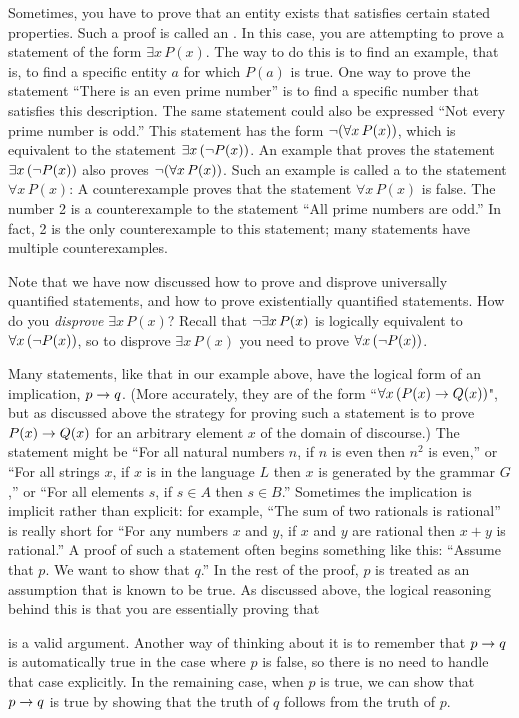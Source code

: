 Sometimes, you have to prove that an entity exists that satisfies
certain stated properties.  Such a proof is called an
.  In this case, you are attempting to
prove a statement of the form $\exists x\,P(x)$.  The way to
do this is to find an example, that is, to find a specific
entity $a$ for which $P(a)$ is true.  One way to prove
the statement ``There is an even prime number'' is to find
a specific number that satisfies this description.  
The same statement could also
be expressed ``Not every prime number is odd.''  This statement
has the form $\lnot(\forall x\,P(x))$, which is equivalent
to the statement $\exists x\,(\lnot P(x))$.  
An example that proves the statement $\exists x\,(\lnot P(x))$
also proves $\lnot(\forall x\,P(x))$.  Such an example is
called a  to the statement $\forall x\,P(x)$:
A counterexample proves that the statement $\forall x\,P(x)$ is false.
The number 2 is a counterexample to the statement ``All prime numbers
are odd.''  In fact, 2 is the only counterexample to this
statement; many statements have multiple counterexamples.

Note that we have now discussed how to prove and disprove
universally quantified statements, and how to prove existentially
quantified statements.  How do you {\em disprove} $\exists x\,P(x)$?
Recall that $\lnot \exists x\,P(x)$ is logically equivalent to
$\forall x\,(\lnot P(x))$, so to disprove $\exists x\,P(x)$ you need
to prove $\forall x\,(\lnot P(x))$.

Many statements, like that in our example above, 
have the logical form of an implication, $p\rightarrow q$.
(More accurately, they
are of the form ``$\forall x\, (P(x) \rightarrow Q(x))$", but as discussed above
the
strategy for proving such a statement is to prove $P(x) \rightarrow Q(x)$ 
for an arbitrary element $x$ of the
domain of discourse.)  The statement
might be ``For all natural numbers $n$, if $n$ is even then $n^2$ is even,'' or ``For
all strings $x$, if $x$ is in the language $L$ then $x$ is generated by the grammar $G$,''
or ``For all elements $s$, if $s \in A$ then $s \in B$.''  Sometimes the implication is
implicit rather than explicit: for example, ``The sum of two rationals is rational'' is
really short for ``For any numbers $x$ and $y$, if $x$ and $y$ are rational then $x+y$
is rational.''
A proof of such a statement often begins something like this:
``Assume that $p$.  We want to show that $q$.''  In the rest of
the proof, $p$ is treated as an assumption that is known to be
true.  As discussed above, the logical reasoning behind this is that 
you are essentially proving that 
\begin{center}
\end{center}
is a valid argument. Another way of thinking about it is to remember
that $p\rightarrow q$ is
automatically true in the case where $p$ is false, so there is no
need to handle that case explicitly.  In the remaining case, when $p$ is
true, we can show that $p\rightarrow q$ is true by showing that the truth of $q$
follows from the truth of $p$.

